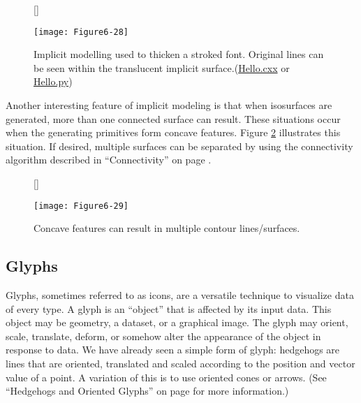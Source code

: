 \begin{figure}[!htb]
	[\FBwidth]
	{\caption{Implicit modelling used to thicken a stroked font. Original lines can be seen within the translucent implicit surface.(\href{https://lorensen.github.io/VTKExamples/site/Cxx/VisualizationAlgorithms/Hello/}{Hello.cxx} or \href{https://lorensen.github.io/VTKExamples/site/Python/VisualizationAlgorithms/Hello/}{Hello.py})}\label{fig:Figure6-28}}
	{\texttt{[image: Figure6-28]}}
\end{figure}

Another interesting feature of implicit modeling is that when isosurfaces are generated, more than one connected surface can result. These situations occur when the generating primitives form concave features. Figure \ref{fig:Figure6-29} illustrates this situation. If desired, multiple surfaces can be separated by using the connectivity algorithm described in ``Connectivity'' on page \pageref{subsec:connectivity}.

\begin{figure}[!htb]
	[\FBwidth]
	{\caption{Concave features can result in multiple contour lines/surfaces.}\label{fig:Figure6-29}}
	{\texttt{[image: Figure6-29]}}
\end{figure}

\subsection{Glyphs}
\label{subsec:glyphs}

Glyphs, sometimes referred to as icons, are a versatile technique to visualize data of every type. A glyph is an ``object'' that is affected by its input data. This object may be geometry, a dataset, or a graphical image. The glyph may orient, scale, translate, deform, or somehow alter the appearance of the object in response to data. We have already seen a simple form of glyph: hedgehogs are lines that are oriented, translated and scaled according to the position and vector value of a point. A variation of this is to use oriented cones or arrows. (See ``Hedgehogs and Oriented Glyphs'' on page \pageref{subsec:hedgehogs_oriented_glyphs} for more information.)


